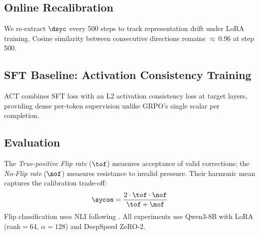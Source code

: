 \subsection{Online Recalibration}
\label{ssec:recalib}

We re-extract $\dsyc$ every 500 steps to track representation drift under LoRA training.
Cosine similarity between consecutive directions remains ${\approx}\,0.96$ at step 500.

\subsection{SFT Baseline: Activation Consistency Training}
\label{ssec:baselines}

ACT \citep{consistency2025bctact} combines SFT loss with an L2 activation consistency loss at target layers, providing dense per-token supervision unlike GRPO's single scalar per completion.

\subsection{Evaluation}
\label{ssec:eval}

The \emph{True-positive Flip rate} ($\tof$) measures acceptance of valid corrections; the \emph{No-Flip rate} ($\nof$) measures resistance to invalid pressure.
Their harmonic mean captures the calibration trade-off:
\begin{equation}
\label{eq:sycon}
\sycon = \frac{2 \cdot \tof \cdot \nof}{\tof + \nof}
\end{equation}
Flip classification uses NLI following \citet{consistency2025bctact}.
All experiments use Qwen3-8B with LoRA (rank$=$64, $\alpha{=}128$) and DeepSpeed ZeRO-2.